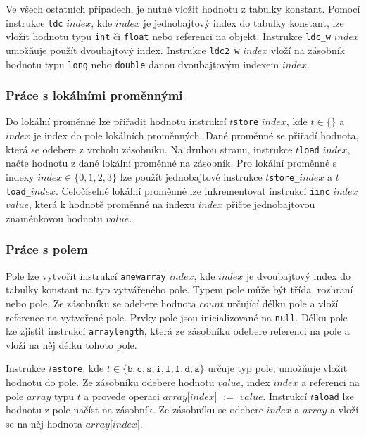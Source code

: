 Ve všech ostatních případech, je nutné vložit hodnotu z tabulky konstant. Pomocí instrukce \texttt{ldc} $index$, kde $index$ je jednobajtový index do tabulky konstant, lze vložit hodnotu typu \texttt{int} či \texttt{float} nebo referenci na objekt. Instrukce \texttt{ldc\_w} $index$ umožňuje použít dvoubajtový index. Instrukce \texttt{ldc2\_w} $index$ vloží na zásobník hodnotu typu \texttt{long} nebo \texttt{double} danou dvoubajtovým indexem  $index$.

\subsubsection{Práce s lokálními proměnnými}

Do lokální proměnné lze přiřadit hodnotu instrukcí $t$\texttt{store} $index$, kde $t \in \{  \}$ a $index$ je index do pole lokálních proměnných. Dané proměnné se přiřadí hodnota, která se odebere z vrcholu zásobníku. Na druhou stranu, instrukce $t$\texttt{load} $index$, načte hodnotu z dané lokální proměnné na zásobník. Pro lokální proměnné s indexy $index \in \{0,1,2,3\}$ lze použít jednobajtové instrukce $t$\texttt{store\_}$index$ a $t$\texttt{load\_}$index$.
Celočíselné lokální proměnné lze inkrementovat instrukcí \texttt{iinc} $index$ $value$, která k hodnotě proměnné na indexu $index$ přičte jednobajtovou znaménkovou hodnotu $value$.

\subsubsection{Práce s polem}


Pole lze vytvořit instrukcí \texttt{anewarray} $index$, kde  $index$ je dvoubajtový index do tabulky konstant na typ vytvářeného pole. Typem pole může být třída, rozhraní nebo pole. Ze zásobníku se odebere hodnota $count$ určující délku pole a vloží reference na vytvořené pole. Prvky pole jsou inicializované  na \texttt{null}. Délku pole lze zjistit instrukcí \texttt{arraylength}, která ze zásobníku odebere referenci na pole a vloží na něj délku tohoto pole.

Instrukce $t$\texttt{astore}, kde $t \in \{\texttt{b}, \texttt{c}, \texttt{s}, \texttt{i}, \texttt{l}, \texttt{f},  \texttt{d}, \texttt{a}  \}$ určuje typ pole, umožňuje vložit hodnotu do pole. Ze zásobníku odebere hodnotu $value$, index $index$ a referenci na pole $array$ typu $t$ a provede operaci $array$[$index$] $:=$ $value$.
Instrukcí $t$\texttt{aload} lze hodnotu z pole načíst na zásobník. Ze zásobníku se odebere $index$ a $array$ a vloží se na něj hodnota $array$[$index$]. 


